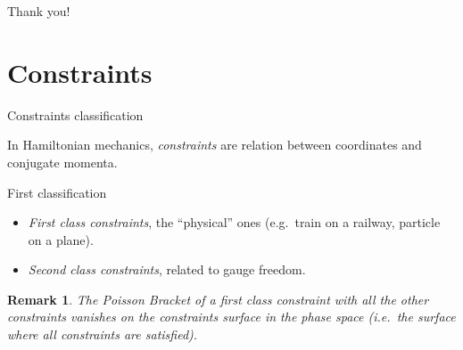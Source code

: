 \documentclass[10pt]{beamer}
\newtheorem*{remark}{Remark}
\begin{document}
  \begin{frame}[standout]
    Thank you!
  \end{frame}

  \appendix

  \section{Constraints}

  \begin{frame}{Constraints classification}
    \begin{definition} \vspace{0.3em}
      In Hamiltonian mechanics, \emph{constraints} are relation between
      coordinates and conjugate momenta.
    \end{definition}
    \begin{alertblock}{First classification}
      \begin{itemize}
        \item \emph{First class constraints}, the ``physical'' ones (e.g.\ train
          on a railway, particle on a plane).
        \item \emph{Second class constraints}, related to gauge freedom.
      \end{itemize}
    \end{alertblock}
    \begin{remark} \vspace{0.3em}
      The Poisson Bracket of a first class constraint with all the
      other constraints vanishes on the constraints surface in the phase space
      (i.e.\ the surface where all constraints are satisfied).
    \end{remark}
  \end{frame}
\end{document}
